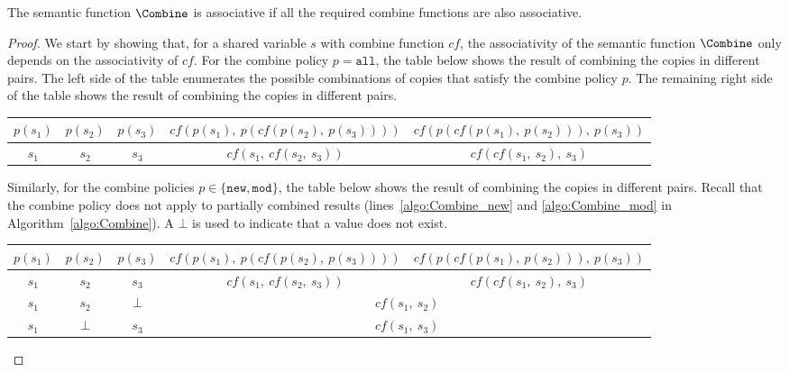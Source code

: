 \begin{theorem}
	\label{thm:associative_combine}
	The semantic function $\Combine$ is associative if all the 
	required combine functions are also associative.
\end{theorem}
\begin{proof}
	We start by showing that, for a shared variable $s$ with 
	combine function $cf$, the associativity of the semantic function 
	$\Combine$ only depends on the associativity of $cf$. For the 
	combine policy $p = \mathtt{all}$, the table below shows the 
	result of combining the copies in different pairs. The 
	left side of the table enumerates the possible combinations of 
	copies that satisfy the combine policy $p$. The remaining right 
	side of the table shows the result of combining the copies in
	different pairs.
	\begin{center}
		\renewcommand{\arraystretch}{1.25}
		\begin{tabular}{| c | c |c || c | c |}
			\hline
			\boldmath$p(s_1)$	& \boldmath$p(s_2)$	&\boldmath$p(s_3)$	& \boldmath$cf(p(s_1),~p(cf(p(s_2),~p(s_3))))$	& \boldmath$cf(p(cf(p(s_1),~p(s_2))),~p(s_3))$	\\ 
			\hline \hline
			$s_1$				& $s_2$				& $s_3$				& $cf(s_1,~cf(s_2,~s_3))$						& $cf(cf(s_1,~s_2),~s_3)$						\\
			\hline
		\end{tabular}
	\end{center}
	Similarly, for the combine policies $p \in \{\mathtt{new}, \mathtt{mod}\}$, the 
	table below shows the result of combining the copies in 
	different pairs. Recall that the combine policy does not apply to 
	partially combined results (lines~\ref{algo:Combine_new} and 
	\ref{algo:Combine_mod} in Algorithm~\ref{algo:Combine}). 
	A $\bot$ is used to indicate that a value does not exist.
	\begin{center}
		\renewcommand{\arraystretch}{1.25}
		\begin{tabular}{| c | c |c || c | c |}
			\hline
			\boldmath$p(s_1)$	& \boldmath$p(s_2)$	&\boldmath$p(s_3)$	& \boldmath$cf(p(s_1),~p(cf(p(s_2),~p(s_3))))$	& \boldmath$cf(p(cf(p(s_1),~p(s_2))),~p(s_3))$	\\ 
			\hline \hline
			$s_1$				& $s_2$				& $s_3$				& $cf(s_1,~cf(s_2,~s_3))$						& $cf(cf(s_1,~s_2),~s_3)$						\\ \hline
			$s_1$				& $s_2$				& $\bot$			& \multicolumn{2}{c|}{$cf(s_1,~s_2)$}															\\ \hline
			$s_1$				& $\bot$			& $s_3$				& \multicolumn{2}{c|}{$cf(s_1,~s_3)$}															\\ \hline

\end{tabular}
\end{center}
\end{proof}
